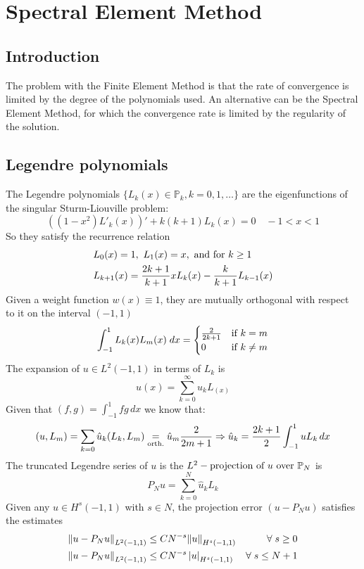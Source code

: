 \section{Spectral Element Method}
\subsection{Introduction}
The problem with the Finite Element Method is that the rate of convergence is limited by the degree of the polynomials used. An alternative can be the Spectral Element Method, for which the convergence rate is limited by the regularity of the solution. 
\subsection{Legendre polynomials}
The Legendre polynomials \(\{L_k(x) \in \mathbb{P}_k, k = 0, 1, \ldots\}\) are the eigenfunctions of the singular Sturm-Liouville problem:
\[
    ((1-x^2)L'_k(x))' + k(k+1)L_k(x) = 0 \quad -1 < x < 1
\]
So they satisfy the recurrence relation
\begin{equation}
    \begin{split}
        &L_0(x) = 1, \ L_1(x) = x, \text{ and for } k \geq 1 \\
        &L_{k+1}(x) = \frac{2k+1}{k+1}xL_k(x) - \frac{k}{k+1}L_{k-1}(x)
    \end{split}
    \label{legendre_polynomials}
\end{equation}
Given a weight function \(w(x) \equiv 1\), they are mutually orthogonal with respect to it on the interval \((-1, 1)\)
\[
    \int_{-1}^1 L_k(x)L_m(x) \; dx = \begin{cases}
        \frac{2}{2k+1} & \text{if } k = m \\
        0 & \text{if } k \neq m
    \end{cases}
\]
The expansion of \(u \in L^2(-1,1)\) in terms of \(L_k\) is 
\[
    u(x) = \sum_{k=0}^{\infty} \hat{u}_k L_(x)
\]
Given that \((f,g) = \int_{-1}^1 fg \, dx\) we know that:
\[
    (u,L_m) = \sum_{k=0} \hat{u}_k (L_k, L_m) \underset{\text{orth.}}{=} \hat{u}_m\frac{2}{2m+1} \Rightarrow \hat{u}_k = \frac{2k+1}{2} \int_{-1}^1 u L_k \, dx
\]
The truncated Legendre series of \(u\) is the \(L^2-\text{projection of } u \text{ over } \mathbb{P}_N\) is 
\begin{equation}
    P_Nu = \sum_{k=0}^{N} \hat{u}_k L_k
\end{equation}
Given any \(u \in H^s(-1,1)\) with \(s \in N\), the projection error \((u-P_Nu)\) satisfies the estimates 
\begin{align*}
    \norm{u-P_Nu}_{L^2(-1,1)} &\leq CN^{-s} \norm{u}_{H^s(-1,1)} & \forall \; s \geq 0 \\
    \norm{u-P_Nu}_{L^2(-1,1)} &\leq CN^{-s} \left\lvert u\right\rvert_{H^s(-1,1)} & \forall \; s \leq N+1 \\
\end{align*}
